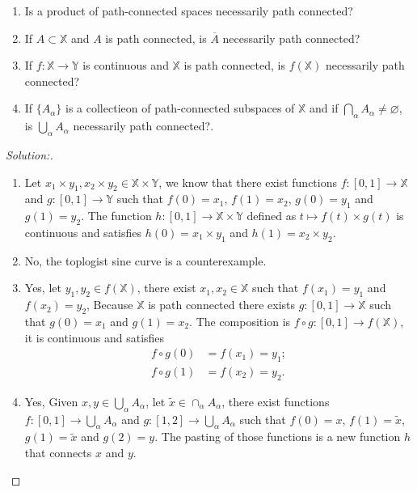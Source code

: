 \documentclass[a4paper,12pt, reqno]{article}
\theoremstyle{definition}
\newenvironment{exerr}[1]{
  \renewcommand\theexeralt{#1}
  \exeralt
}{\endexeralt}
\newenvironment{solution}{\begin{proof}[Solution:]}{\end{proof}}
\newcommand{\X}{\mathbb{X}}
\newcommand{\Y}{\mathbb{Y}}
\begin{document}
\begin{exerr}{8}
  \hfill
  \begin{enumerate}[label=(\alph*)]
    \item Is a product of path-connected spaces necessarily path connected?
    \item If $A\subset\X$ and $A$ is path connected, is $\overline{A}$ necessarily path connected?
    \item If $f:\X\to\Y$ is continuous and $\X$ is path connected, is $f(\X)$ necessarily path connected?
    \item If $\{ A_{\alpha} \}$ is a collectieon of path-connected subspaces of $\X$ and if $\bigcap_{\alpha}A_{\alpha}\neq \varnothing$, is $\bigcup_{\alpha}A_{\alpha}$ necessarily path connected?.
  \end{enumerate}
\end{exerr}
\begin{solution}\hfill
  \begin{enumerate}[label=(\alph*)]
    \item Let $x_{1}\times y_{1},x_{2}\times y_{2}\in\X\times\Y$, we know that there exist functions $f:[0,1]\to\X$ and $g:[0,1]\to\Y$ such that $f(0)=x_{1}$, $f(1) = x_{2}$, $g(0) = y_{1}$ and $g(1) = y_{2}$. The function $h:[0,1]\to\X\times \Y$ defined as $t\mapsto f(t)\times g(t)$ is continuous and satisfies $h(0) = x_{1}\times y_{1}$ and $h(1) = x_{2}\times y_{2}$.
    \item No, the toplogist sine curve is a counterexample.
    \item Yes, let $y_{1},y_{2}\in f(\X)$, there exist $x_{1},x_{2}\in\X$ such that $f(x_{1}) = y_{1}$ and $f(x_{2}) = y_{2}$, Because $\X$ is path connected there exists $g:[0,1]\to\X$ such that $g(0) = x_{1}$ and $g(1) = x_{2}$. The composition is $f\circ g : [0,1]\to f(\X)$, it is continuous and satisfies
    \begin{align*}
      f\circ g(0) &= f(x_{1}) = y_{1};\\
      f\circ g(1) &= f(x_{2}) = y_{2}.
    \end{align*}
    \item Yes, Given $x,y\in\bigcup_{\alpha}A_{\alpha}$, let $\widetilde{x}\in \cap_{\alpha}A_{\alpha}$, there exist functions $f:[0,1]\to\bigcup_{\alpha}A_{\alpha}$ and $g:[1,2]\to\bigcup_{\alpha}A_{\alpha}$ such that $f(0) =x$, $f(1) = \widetilde{x}$, $g(1) = \widetilde{x}$ and $g(2) = y$. The pasting of those functions is a new function $h$ that connects $x$ and $y$.
  \end{enumerate}
\end{solution}
\end{document}
